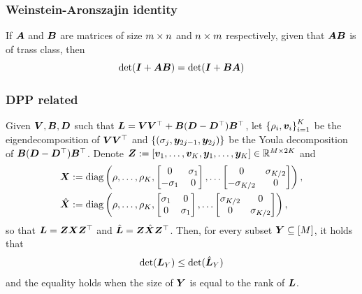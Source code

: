 \documentclass[10pt]{article}
\begin{document}
\subsubsection{Weinstein-Aronszajin identity}
If ${\bm{A}}$ and ${\bm{B}}$ are matrices of size $m \times n $ and $n \times m$ respectively, given that ${\bm{A}} {\bm{B}}$ is of trass class, then 
\begin{equation}
    \det({\bm{I}} + {\bm{A}} {\bm{B}}) = \det({\bm{I}} + {\bm{B}} {\bm{A}})
\end{equation}
\subsubsection{DPP related}
 Given ${\bm{V}}, {\bm{B}}, {\bm{D}}$ such that ${\bm{L}} = {\bm{V}} {\bm{V}}^{\top} + {\bm{B}} ({\bm{D}} - {\bm{D}}^{\top}) {\bm{B}}^{\top}$, let $\left\{ \rho_i, {\bm{v}}_i \right\}_{i=1}^K$ be the eigendecomposition of ${\bm{V}} {\bm{V}}^{\top}$ and $\left\{ (\sigma_j, {\bm{y}}_{2j-1}, {\bm{y}}_{2j}) \right\}$ be the Youla decomposition of ${\bm{B}} ({\bm{D}}- {\bm{D}}^{\top}) {\bm{B}}^{\top}$. Denote ${\bm{Z}} := [{\bm{v}}_1, \dots, {\bm{v}}_K, {\bm{y}}_1, \dots, {\bm{y}}_K] \in \mathbb{R}^{M \times 2K}$ and 
\begin{align*}
    {\bm{X}} &:= \text{diag}\left(\rho, \dots, \rho_K, \begin{bmatrix}
        0 & \sigma_1 \\ 
        -\sigma_1 & 0 
    \end{bmatrix}, \dots 
    \begin{bmatrix}
        0 & \sigma_{K/2} \\ 
        -\sigma_{K/2} & 0 
    \end{bmatrix}
    \right), \\
    \hat{{\bm{X}}} &:= \text{diag}\left(\rho, \dots, \rho_K, \begin{bmatrix}
        \sigma_1 & 0 \\ 
        0 & \sigma_1 
    \end{bmatrix}, \dots 
    \begin{bmatrix}
        \sigma_{K/2} & 0 \\ 
        0 & \sigma_{K/2} 
    \end{bmatrix}
    \right), 
\end{align*}
so that ${\bm{L}} = {\bm{Z}} {\bm{X}} {\bm{Z}}^{\top}$ and $\hat{{\bm{L}}} = {\bm{Z}} \hat{{\bm{X}}} {\bm{Z}}^{\top}$. Then, for every subset ${\bm{Y}} \subseteq [M]$, it holds that 
\begin{equation}
    \det ({\bm{L}}_Y) \leq \det (\hat{{\bm{L}}}_Y) 
\end{equation}
and the equality holds when the size of ${\bm{Y}}$ is equal to the rank of ${\bm{L}}$. \\~\\
\end{document}

